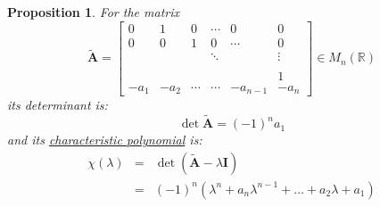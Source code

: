 \documentclass[a4paper,10pt,oneside]{book}
\newtheorem{proposition}[theorem]{Proposition}
\begin{document}
\begin{proposition}\label{prop:contrMatrixCharactPolynomial}
 For the matrix
\begin{equation}
 \tilde{\mathbf{A}}=\left[ {\begin{array}{cccccc}
 0&1&0&\cdots&0&0 \\
 0&0&1&0&\cdots&0 \\
 &&&\ddots&&\vdots \\
 &&&&& \\
 &&&&&1 \\
-a_1&-a_2&\cdots&\cdots&-a_{n-1}&-a_n\end{array} } \right]\in M_n(\mathbb{R})
\end{equation}
its determinant is:
\begin{equation}
 \operatorname{det}\tilde{\mathbf{A}}=(-1)^n a_1
\end{equation}
and its \hyperlink{def:characteristicPolynomial}{characteristic polynomial} is:
\begin{eqnarray}
 \chi(\lambda)&=&\operatorname{det}(\tilde{\mathbf{A}}-\lambda\mathbf{I})\\
&=& (-1)^{n}(\lambda^n+
a_n\lambda^{n-1}+
\ldots+
a_2\lambda+
a_1)
\end{eqnarray}
\end{proposition}
\end{document}
